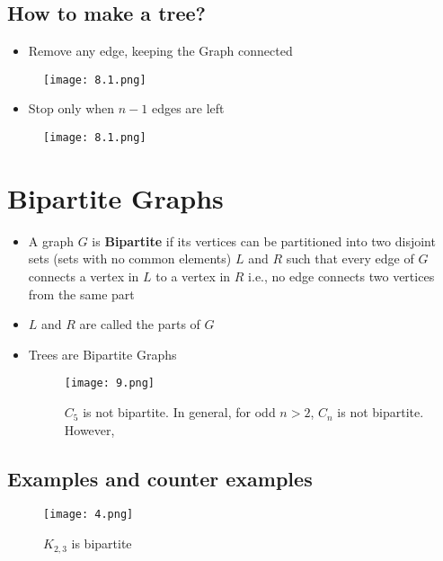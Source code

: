 \subsection{How to make a tree?}
\begin{itemize}
\item Remove any edge, keeping the Graph connected
\end{itemize}
\begin{figure}[h]\label{fig_5}
	\centering
	\texttt{[image: 8.1.png]}
\end{figure}
\begin{itemize}
\item Stop only when $n-1$ edges are left
\end{itemize}
\begin{figure}[h]\label{fig_5}
	\centering
	\texttt{[image: 8.1.png]}
\end{figure}
\section{Bipartite Graphs}
\begin{itemize}
\item A graph $G$ is \textbf{Bipartite} if its vertices can be partitioned into two disjoint sets (sets with no common elements) $L$ and $R$ such that every edge of $G$ connects a vertex in $L$ to a vertex in $R$  i.e., no edge connects two vertices from
the same part
\item $L$ and $R$ are called the parts of $G$
\item Trees are Bipartite Graphs
\begin{figure}[h]\label{fig_2}
	\centering
	\texttt{[image: 9.png]}
	\caption{$C_{5}$ is not bipartite. In general, for odd $n > 2$, $C_{n}$ is not bipartite. However, }
\end{figure}
\end{itemize}
\subsection{Examples and counter examples}
\begin{figure}[h]\label{fig_2}
	\centering
	\texttt{[image: 4.png]}
	\caption{$K_{2,3}$ is bipartite}
\end{figure}
